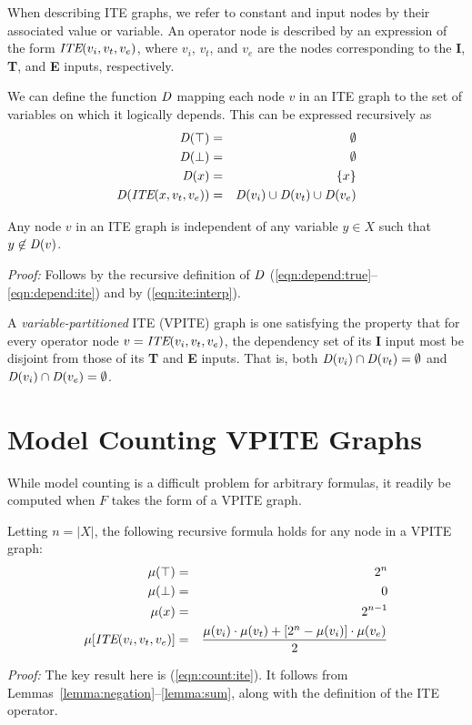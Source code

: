 \documentclass{llncs}
\newcommand{\tautology}{\top}
\newcommand{\nil}{\bot}
\newcommand{\ite}{\mbox{\it ITE}}
\newcommand{\mcount}{\mu}
\newcommand{\ifarg}{\textbf{I}}
\newcommand{\thenarg}{\textbf{T}}
\newcommand{\elsearg}{\textbf{E}}
\newcommand{\depend}{{\it D}}
\begin{document}
When describing ITE graphs, we refer to constant and input
nodes by their associated value or variable.  An operator node is described by an expression of the form
$\ite(v_i, v_t, v_e)$, where $v_i$, $v_t$, and $v_e$ are the
nodes corresponding to the \ifarg{}, \thenarg{}, and \elsearg{} inputs, respectively.

We can define the function $\depend$ mapping each node
$v$ in an ITE graph to the set of variables on which it logically depends.  This can be expressed recursively as
\begin{eqnarray}
\depend(\tautology) & = & \emptyset \label{eqn:depend:true}\\
\depend(\nil) & = & \emptyset \label{eqn:depend:false}\\
\depend(x) & = & \{x \} \label{eqn:depend:variable}\\
\depend(\ite(x, v_t, v_e)) & = & \depend(v_i) \cup \depend(v_t) \cup \depend(v_e) \label{eqn:depend:ite}
\end{eqnarray}  


\begin{lemma}
\label{lemma:independent:dset}
Any node $v$ in an ITE graph is independent of any variable $y \in X$ such that $y \not \in \depend(v)$.
\end{lemma}  
\noindent
{\em Proof:} Follows by the recursive definition of $\depend$ (\ref{eqn:depend:true}--\ref{eqn:depend:ite}) and by (\ref{eqn:ite:interp}).

A {\em variable-partitioned} ITE (VPITE) graph is one satisfying the property
that for every operator node $v = \ite(v_i, v_t, v_e)$, the dependency
set of its \ifarg{} input most be disjoint from those of its
\thenarg{} and \elsearg{} inputs.  That is, both $\depend(v_i) \cap \depend(v_t) = \emptyset$ and
$\depend(v_i) \cap \depend(v_e) = \emptyset$.

\section{Model Counting VPITE Graphs}

While model counting is a difficult problem for arbitrary
formulas, it readily be computed when $F$ takes the form of a VPITE graph.

\begin{theorem}
\label{theorem:count}
Letting $n = |X|$, the following recursive formula holds for any node in a VPITE graph:
\begin{eqnarray}
\mcount(\tautology) & = & 2^{n} \label{eqn:count:true}\\
\mcount(\nil) & = & 0 \label{eqn:count:false}\\
\mcount(x) & = & 2^{n-1} \label{eqn:count:variable}\\
\mcount[\ite(v_i, v_t, v_e)] & = & \frac{\mcount(v_i) \cdot \mcount(v_t) + [2^n-\mcount(v_i)] \cdot \mcount(v_e)}{2} \label{eqn:count:ite}
\end{eqnarray}  
\end{theorem}
\noindent
{\em Proof:} The key result here is (\ref{eqn:count:ite}).  It follows
from Lemmas~\ref{lemma:negation}--\ref{lemma:sum}, along with the definition of the ITE operator.
\end{document}
